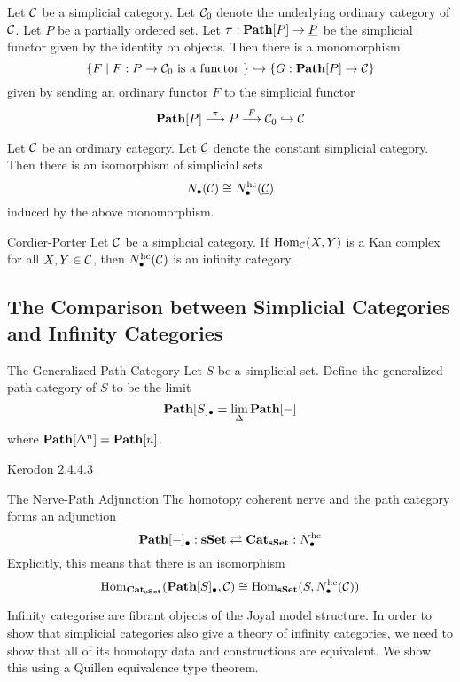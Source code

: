 \documentclass[a4paper]{article}
\begin{document}
\begin{prp}{}{} Let $\mathcal{C}$ be a simplicial category. Let $\mathcal{C}_0$ denote the underlying ordinary category of $\mathcal{C}$. Let $P$ be a partially ordered set. Let $\pi:\bold{Path}[P]\to\underline{P}$ be the simplicial functor given by the identity on objects. Then there is a monomorphism $$\{F\;|\;F:P\to\mathcal{C}_0\text{ is a functor }\}\hookrightarrow\{G:\bold{Path}[P]\to\mathcal{C}\}$$ given by sending an ordinary functor $F$ to the simplicial functor $$\bold{Path}[P]\overset{\pi}{\longrightarrow}P\overset{F}{\longrightarrow}\mathcal{C}_0\hookrightarrow\mathcal{C}$$
\end{prp}

\begin{lmm}{}{} Let $\mathcal{C}$ be an ordinary category. Let $\underline{\mathcal{C}}$ denote the constant simplicial category. Then there is an isomorphism of simplicial sets $$N_\bullet(\mathcal{C})\cong N_\bullet^\text{hc}(\underline{\mathcal{C}})$$ induced by the above monomorphism. 
\end{lmm}

\begin{thm}{Cordier-Porter}{} Let $\mathcal{C}$ be a simplicial category. If $\operatorname{Hom}_{\mathcal{C}}(X,Y)$ is a Kan complex for all $X,Y\in\mathcal{C}$, then $N_\bullet^\text{hc}(\mathcal{C})$ is an infinity category. 
\end{thm}

\subsection{The Comparison between Simplicial Categories and Infinity Categories}
\begin{defn}{The Generalized Path Category}{} Let $S$ be a simplicial set. Define the generalized path category of $S$ to be the limit $$\bold{Path}[S]_\bullet=\lim_{\Delta}\bold{Path}[-]$$ where $\bold{Path}[\Delta^n]=\bold{Path}[n]$. 
\end{defn}

Kerodon 2.4.4.3

\begin{thm}{The Nerve-Path Adjunction}{} The homotopy coherent nerve and the path category forms an adjunction $$\bold{Path}[-]_\bullet:\bold{sSet}\rightleftarrows\bold{Cat}_\bold{sSet}:N_\bullet^\text{hc}$$ Explicitly, this means that there is an isomorphism $$\operatorname{Hom}_{\bold{Cat}_\bold{sSet}}(\bold{Path}[S]_\bullet,\mathcal{C})\cong\operatorname{Hom}_\bold{sSet}(S,N_\bullet^\text{hc}(\mathcal{C}))$$
\end{thm}

Infinity categorise are fibrant objects of the Joyal model structure. In order to show that simplicial categories also give a theory of infinity categories, we need to show that all of its homotopy data and constructions are equivalent. We show this using a Quillen equivalence type theorem. 
\end{document}

